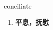 
\begin{frame}
{\huge conciliate}
\begin{center}
\begin{enumerate}\Large
  \item \textbf{平息，抚慰}
\end{enumerate}
\end{center}
\end{frame}
